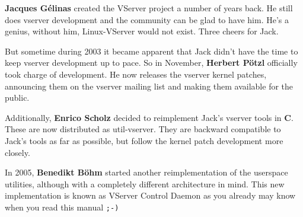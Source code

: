 \textbf{Jacques Gélinas} created the VServer project a number of years back.
He still does vserver development and the community can be glad to have him.
He's a genius, without him, Linux-VServer would not exist. Three cheers for
Jack.

But sometime during 2003 it became apparent that Jack didn't have the time to
keep vserver development up to pace. So in November, \textbf{Herbert Pötzl}
officially took charge of development. He now releases the vserver kernel
patches, announcing them on the vserver mailing list and making them available
for the public.

Additionally, \textbf{Enrico Scholz} decided to reimplement Jack's vserver
tools in \textbf{C}.  These are now distributed as util-vserver. They are
backward compatible to Jack's tools as far as possible, but follow the kernel
patch development more closely.

In 2005, \textbf{Benedikt Böhm} started another reimplementation of the
userspace utilities, although with a completely different architecture in mind.
This new implementation is known as VServer Control Daemon as you already may
know when you read this manual \texttt{;-)}
